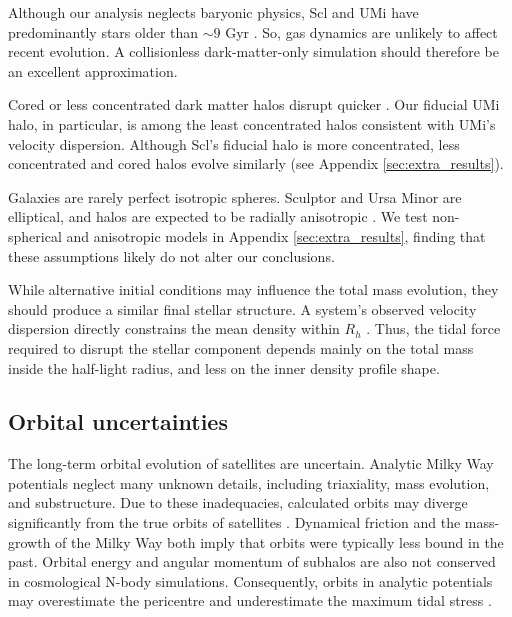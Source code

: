 Although our analysis neglects baryonic physics, Scl and UMi have
predominantly stars older than \(\sim 9\) Gyr
\citep{carrera+2002, deboer+2011, weisz+2014, delosreyes+2022, sato+2025}.
So, gas dynamics are unlikely to affect recent evolution. A
collisionless dark-matter-only simulation should therefore be an
excellent approximation.

Cored or less concentrated dark matter halos disrupt quicker
\citep[e.g.,][]{stucker+2023}. Our fiducial UMi halo, in particular, is
among the least concentrated halos consistent with UMi's velocity
dispersion. Although Scl's fiducial halo is more concentrated, less
concentrated and cored halos evolve similarly (see Appendix
\ref{sec:extra_results}).

Galaxies are rarely perfect isotropic spheres. Sculptor and Ursa Minor
are elliptical, and halos are expected to be radially anisotropic
\citep[e.g.,][]{navarro+2010}. We test non-spherical and anisotropic
models in Appendix \ref{sec:extra_results}, finding that these
assumptions likely do not alter our conclusions.

While alternative initial conditions may influence the total mass
evolution, they should produce a similar final stellar structure. A
system's observed velocity dispersion directly constrains the mean
density within \(R_h\) \citep[e.g.,][]{wolf+2010}. Thus, the tidal force
required to disrupt the stellar component depends mainly on the total
mass inside the half-light radius, and less on the inner density profile
shape.

\subsection{Orbital uncertainties}\label{sec:scl_umi_orbit_uncert}

The long-term orbital evolution of satellites are uncertain. Analytic
Milky Way potentials neglect many unknown details, including
triaxiality, mass evolution, and substructure. Due to these
inadequacies, calculated orbits may diverge significantly from the true
orbits of satellites \citep[e.g.,][]{dsouza+bell2022}. Dynamical
friction and the mass-growth of the Milky Way both imply that orbits
were typically less bound in the past. Orbital energy and angular
momentum of subhalos are also not conserved in cosmological N-body
simulations. Consequently, orbits in analytic potentials may
overestimate the pericentre and underestimate the maximum tidal stress
\citep[although typically not by enough to change our
conclusions,][]{santistevan+2023, santistevan+2024}.

